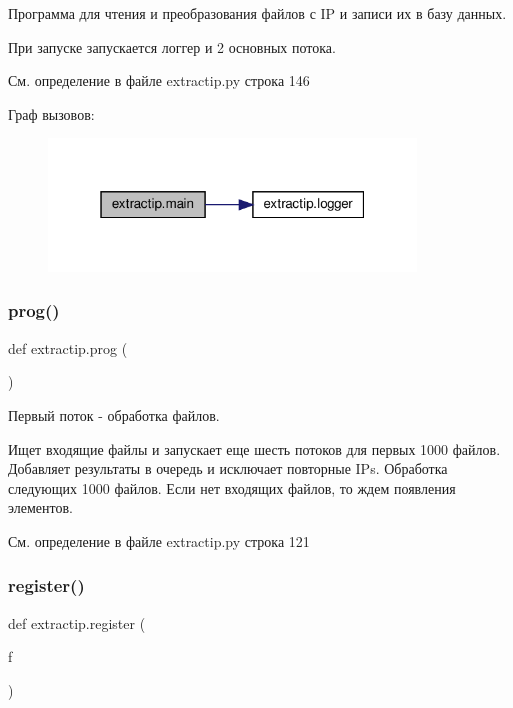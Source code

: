 Программа для чтения и преобразования файлов с IP и записи их в базу данных. 

При запуске запускается логгер и 2 основных потока. 

См. определение в файле extractip.\+py строка 146

Граф вызовов\+:\nopagebreak
\begin{figure}[H]
\begin{center}
\leavevmode
\includegraphics[width=277pt]{namespaceextractip_a4400b3ea86ebdf89264ad2424ca152e4_cgraph}
\end{center}
\end{figure}
\mbox{\label{namespaceextractip_a3683febfdca5f525d87e4066e121b146}} 
\subsubsection{\texorpdfstring{prog()}{prog()}}
{\footnotesize\ttfamily def extractip.\+prog (\begin{DoxyParamCaption}{ }\end{DoxyParamCaption})}



Первый поток -\/ обработка файлов. 

Ищет входящие файлы и запускает еще шесть потоков для первых 1000 файлов. Добавляет результаты в очередь и исключает повторные I\+Ps. Обработка следующих 1000 файлов. Если нет входящих файлов, то ждем появления элементов. 

См. определение в файле extractip.\+py строка 121

\mbox{\label{namespaceextractip_a93e2b267d1b4fe1cef5c09f3b66217c0}} 
\subsubsection{\texorpdfstring{register()}{register()}}
{\footnotesize\ttfamily def extractip.\+register (\begin{DoxyParamCaption}\item[{}]{f }\end{DoxyParamCaption})}




